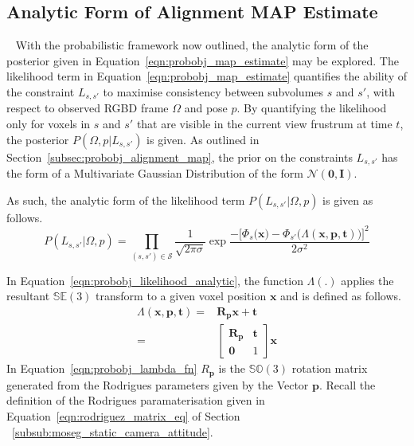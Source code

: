 \subsection{Analytic Form of Alignment MAP Estimate}
~\label{subsec:probobj_analytic_alignment_map}
With the probabilistic framework now outlined, the analytic form of the
posterior given in Equation~\ref{eqn:probobj_map_estimate} may be explored. The
likelihood term in Equation~\ref{eqn:probobj_map_estimate} quantifies the
ability of the constraint \(L_{s, s'}\) to maximise consistency between subvolumes
\(s\) and \(s'\), with respect to observed RGBD frame \( \Omega \) and pose \(p\). By
quantifying the likelihood only for voxels in \(s\) and \(s'\) that are visible in
the current view frustrum at time \(t\), the posterior \(P(\Omega, p | L_{s, s'})\)
is given. As outlined in Section~\ref{subsec:probobj_alignment_map}, the prior
on the constraints \(L_{s, s'}\) has the form of a Multivariate Gaussian
Distribution of the form \(\mathcal{N}(\bm{0}, \bm{I})\).

As such, the analytic form of the likelihood term \(P(L_{s, s'} | \Omega, p)\) is
given as follows.
\begin{equation}
  \label{eqn:probobj_likelihood_analytic}
  P(L_{s, s'} | \Omega, p) = \prod_{(s, s') \in \mathcal{S}}
  \frac{1}{\sqrt{2 \pi \sigma}}
  \exp{\frac{-{\Big[\Phi_{s}\Big(\bm{x}\Big) -
  \Phi_{s'}\Big(\Lambda(\bm{x}, \bm{p}, \bm{t})\Big)\Big]}^{2}}
  {2\sigma^{2}}}
\end{equation}

In Equation~\ref{eqn:probobj_likelihood_analytic}, the function \(\Lambda(.)\)
applies the resultant \(\mathbb{SE}(3)\) transform to a given voxel position
\(\bm{x}\) and is defined as follows.
\begin{align}
  \label{eqn:probobj_lambda_fn}
  \Lambda(\bm{x}, \bm{p}, \bm{t}) ={}&
  \bm{R}_{\bm{p}} \bm{x} + \bm{t}\\
  ={}& 
  \begin{bmatrix}
    \bm{R}_{\bm{p}} & \bm{t} \\
    \bm{0} & 1
  \end{bmatrix}
  \bm{x}
\end{align}
In Equation~\ref{eqn:probobj_lambda_fn} \(R_{\bm{p}}\) is the \(\mathbb{SO}(3)\)
rotation matrix generated from the Rodrigues parameters given by the Vector
\(\bm{p}\). Recall the definition of the Rodrigues paramaterisation given in
Equation~\ref{eqn:rodriguez_matrix_eq} of Section
~\ref{subsub:moseg_static_camera_attitude}.

